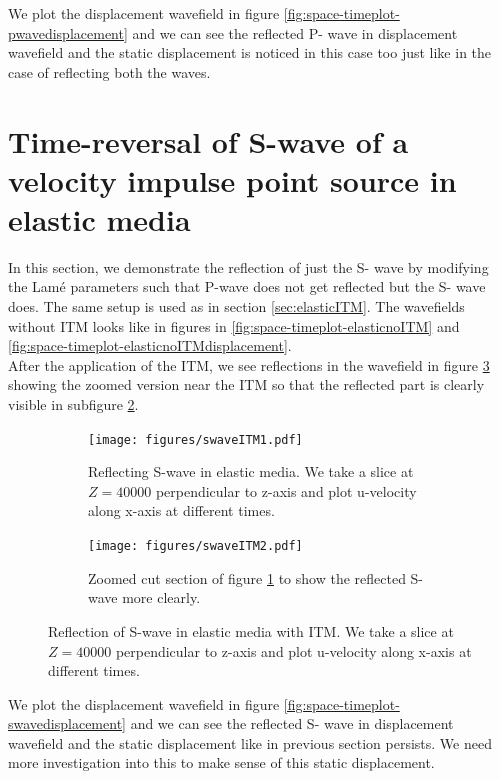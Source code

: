 We plot the displacement wavefield in figure \ref{fig:space-timeplot-pwavedisplacement} and we can see the reflected P- wave in displacement wavefield and the static
displacement is noticed in this case too just like in the case of reflecting both the waves. 

\section{Time-reversal of S-wave of a velocity impulse point source in elastic media} \label{sec:elasticITMswave}
In this section, we demonstrate the reflection of just the S- wave by modifying the Lam\'{e} parameters such that P-wave does not
get reflected but the S- wave does. The same setup is used as in section \ref{sec:elasticITM}. The wavefields without \ac{ITM} looks like in figures in \ref{fig:space-timeplot-elasticnoITM}
and \ref{fig:space-timeplot-elasticnoITMdisplacement}. \\

After the application of the \ac{ITM}, we see reflections in the wavefield in figure \ref{fig:space-timeplot-swave} showing the zoomed version near the 
\ac{ITM} so that the reflected part is clearly visible in subfigure \ref{subfig:swavezoomed}.

\begin{figure}
    \begin{subfigure}[t]{0.49\textwidth}   
        \centering 
        \texttt{[image: figures/swaveITM1.pdf]}
        \caption{Reflecting S-wave in elastic media. We take a slice at $Z=40000$ perpendicular to z-axis
        and plot u-velocity along x-axis at different times.}
        \label{subfig:swave}
    \end{subfigure}
    \hfill
    \begin{subfigure}[t]{0.49\textwidth}   
        \centering 
        \texttt{[image: figures/swaveITM2.pdf]}
        \caption{Zoomed cut section of figure \ref{subfig:swave} to show the reflected S-wave more clearly.}
        \label{subfig:swavezoomed}
    \end{subfigure}
    \caption{Reflection of S-wave in elastic media with \ac{ITM}. We take a slice at $Z=40000$ perpendicular to z-axis and plot u-velocity along x-axis at different times.}
    \label{fig:space-timeplot-swave}
\end{figure}
    
We plot the displacement wavefield in figure \ref{fig:space-timeplot-swavedisplacement} and we can see the reflected S- wave in displacement 
wavefield and the static displacement like in previous section persists. We need more investigation into this to make sense of this static displacement.

